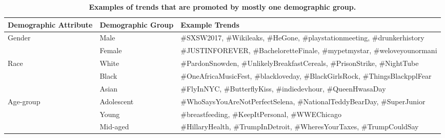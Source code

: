 \documentclass[letterpaper]{article}
\begin{document}
\begin{table*}[t]
\center
\small
\begin{tabular}{|p{}|p{}|p{}|}
\hline
{\bf Demographic Attribute} & {\bf Demographic Group} & {\bf Example Trends} \\
\hline
\multirow{2}{*}{Gender} & {Male} & \#SXSW2017, \#Wikileaks, \#HeGone, \#playstationmeeting, \#drunkerhistory  \\
\cline{2-3}
~ & Female & \#JUSTINFOREVER, \#BacheloretteFinale, \#mypetmystar, \#weloveyounormani   \\
\hline
\multirow{3}{*}{Race} & {White} & \#PardonSnowden, \#UnlikelyBreakfastCereals, \#PrisonStrike, \#NightTube\\
\cline{2-3}
~ & Black & \#OneAfricaMusicFest, \#blackloveday, \#BlackGirlsRock, \#ThingsBlackpplFear  \\
\cline{2-3}
~ & Asian & \#FlyInNYC, \#ButterflyKiss, \#indiedevhour, \#QueenHwasaDay \\
\hline
\multirow{3}{*}{Age-group} & {Adolescent} & \#WhoSaysYouAreNotPerfectSelena, \#NationalTeddyBearDay, \#SuperJunior \\
\cline{2-3}
~ & Young & \#breastfeeding, \#KeepItPersonal, \#WWEChicago \\
\cline{2-3}
~ & Mid-aged & \#HillaryHealth, \#TrumpInDetroit, \#WheresYourTaxes, \#TrumpCouldSay \\
\hline
\end{tabular}
\vspace*{-2mm}
\caption{{\bf Examples of trends that are promoted by mostly one demographic group.}}
\label{tab:niche_interest}
\vspace*{-3mm}
\end{table*}
\end{document}
